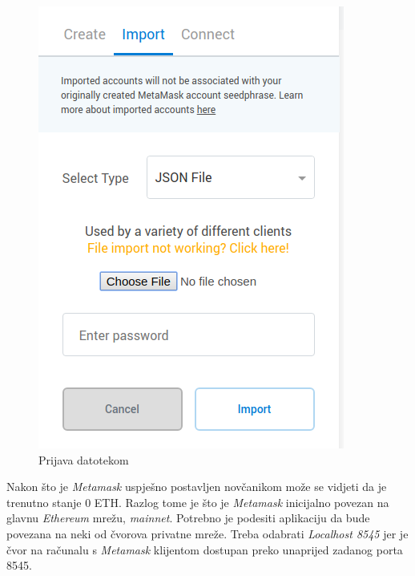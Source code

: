 \documentclass[times, utf8, zavrsni, numeric]{fer}
\begin{document}
\begin{figure}[ht]
\begin{minipage}[b]{0.4\textwidth}
    \includegraphics[width=\textwidth]{mmiportjason.png}
    \caption{Prijava datotekom}
  \end{minipage}
\end{figure}

Nakon što je \emph{Metamask} uspješno postavljen novčanikom može se vidjeti da je trenutno stanje 0 ETH. Razlog tome je što je \emph{Metamask} inicijalno povezan
na glavnu \emph{Ethereum} mrežu, \emph{mainnet}. Potrebno je podesiti aplikaciju da bude povezana na neki od čvorova privatne mreže. Treba odabrati \emph{Localhost 8545}
jer je čvor na računalu s \emph{Metamask} klijentom dostupan preko unaprijed zadanog porta 8545. 

\pagebreak
\end{document}
